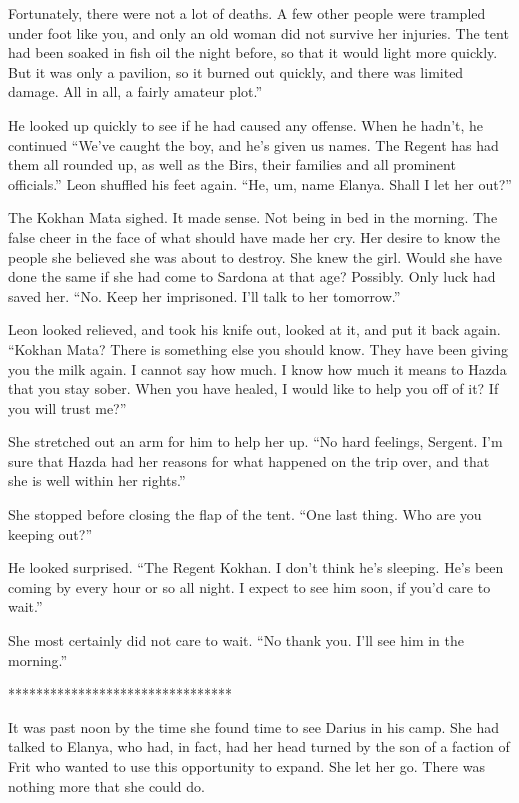 \documentclass{article}
\begin{document}
	Fortunately, there were not a lot of deaths. A few other people were trampled under foot like you, and only an old woman did not survive her injuries. The tent had been soaked in fish oil the night before, so that it would light more quickly. But it was only a pavilion, so it burned out quickly, and there was limited damage. All in all, a fairly amateur plot.”
	
	He looked up quickly to see if he had caused any offense. When he hadn’t, he continued “We’ve caught the boy, and he’s given us names. The Regent has had them all rounded up, as well as the Birs, their families and all prominent officials.” Leon shuffled his feet again. “He, um, name Elanya. Shall I let her out?”
	
	The Kokhan Mata sighed. It made sense. Not being in bed in the morning. The false cheer in the face of what should have made her cry. Her desire to know the people she believed she was about to destroy. She knew the girl. Would she have done the same if she had come to Sardona at that age? Possibly. Only luck had saved her. “No. Keep her imprisoned. I’ll talk to her tomorrow.” 
	
	Leon looked relieved, and took his knife out, looked at it, and put it back again. “Kokhan Mata? There is something else you should know. They have been giving you the milk again. I cannot say how much. I know how much it means to Hazda that you stay sober. When you have healed, I would like to help you off of it? If you will trust me?”
	
	She stretched out an arm for him to help her up. “No hard feelings, Sergent. I’m sure that Hazda had her reasons for what happened on the trip over, and that she is well within her rights.” 
	
	She stopped before closing the flap of the tent. “One last thing. Who are you keeping out?”
	
	He looked surprised. “The Regent Kokhan. I don’t think he’s sleeping. He’s been coming by every hour or so all night. I expect to see him soon, if you’d care to wait.”
	
	She most certainly did not care to wait. “No thank you. I’ll see him in the morning.”
	
	
	********************************
	
	It was past noon by the time she found time to see Darius in his camp. She had talked to Elanya, who had, in fact, had her head turned by the son of a faction of Frit who wanted to use this opportunity to expand. She let her go. There was nothing more that she could do.
	
\end{document}
